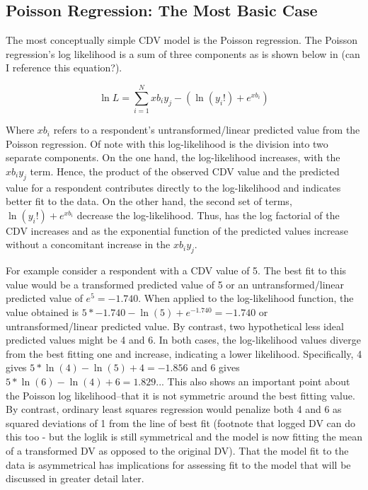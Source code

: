 \documentclass[ShortAfour,times,sageapa]{sagej}
\begin{document}
	\subsection{Poisson Regression: The Most Basic Case}
	
	The most conceptually simple CDV model is the Poisson regression.  
	The Poisson regression's log likelihood is a sum of three components as is shown below in (can I reference this equation?).
	
	\begin{equation}
		\ln L = \sum_{i=1}^{N} xb_{i}y_{j} - (\ln (y_{i}!) + e^{xb_{i}})
	\end{equation}

	Where $xb_{i}$ refers to a respondent's untransformed/linear predicted value from the Poisson regression.  
	Of note with this log-likelihood is the division into two separate components.  
	On the one hand, the log-likelihood increases, with the $xb_{i}y_{j}$ term.  
	Hence, the product of the observed CDV value and the predicted value for a respondent contributes directly to the log-likelihood and indicates better fit to the data.
	On the other hand, the second set of terms, $\ln (y_{i}!) + e^{xb_{i}}$ decrease the log-likelihood.  
	Thus, has the log factorial of the CDV increases and as the exponential function of the predicted values increase without a concomitant increase in the $xb_{i}y_{j}$.
	
	For example consider a respondent with a CDV value of 5.  
	The best fit to this value would be a transformed predicted value of 5 or an untransformed/linear predicted value of $e^{5} = -1.740$.  
	When applied to the log-likelihood function, the value obtained is $5*-1.740 - \ln (5) + e^{-1.740} = -1.740$ or untransformed/linear predicted value.
	By contrast, two hypothetical less ideal predicted values might be 4 and 6.  
	In both cases, the log-likelihood values diverge from the best fitting one and increase, indicating a lower likelihood.
	Specifically, 4 gives $5*\ln (4) - \ln (5) + 4 = -1.856$ and 6 gives $5*\ln (6) - \ln (4) + 6 = 1.829$...
	This also shows an important point about the Poisson log likelihood--that it is not symmetric around the best fitting value.  
	By contrast, ordinary least squares regression would penalize both 4 and 6 as squared deviations of 1 from the line of best fit (footnote that logged DV can do this too - but the loglik is still symmetrical and the model is now fitting the mean of a transformed DV as opposed to the original DV).
	That the model fit to the data is asymmetrical has implications for assessing fit to the model that will be discussed in greater detail later.
	
\end{document}

